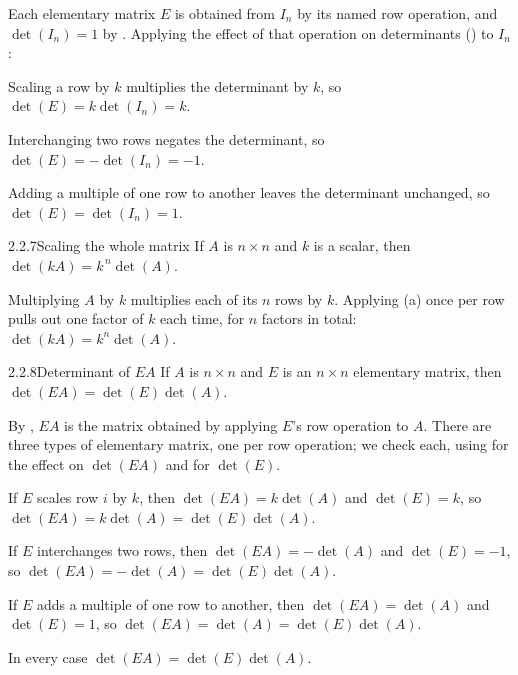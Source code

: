 \begin{prf}
Each elementary matrix $E$ is obtained from $I_n$ by its named row operation, and $\det(I_n)=1$ by . Applying the effect of that operation on determinants () to $I_n$:

 Scaling a row by $k$ multiplies the determinant by $k$, so $\det(E)=k\det(I_n)=k$.

 Interchanging two rows negates the determinant, so $\det(E)=-\det(I_n)=-1$.

 Adding a multiple of one row to another leaves the determinant unchanged, so $\det(E)=\det(I_n)=1$.
\end{prf}

\begin{thms}{2.2.7}{Scaling the whole matrix}
If $A$ is $n\times n$ and $k$ is a scalar, then $\det(kA)=k^{\,n}\det(A)$.
\end{thms}

\begin{prf}
Multiplying $A$ by $k$ multiplies each of its $n$ rows by $k$. Applying (a) once per row pulls out one factor of $k$ each time, for $n$ factors in total: $\det(kA)=k^n\det(A)$.
\end{prf}

\begin{thms}{2.2.8}{Determinant of $EA$}
If $A$ is $n\times n$ and $E$ is an $n\times n$ elementary matrix, then $\det(EA)=\det(E)\det(A)$.
\end{thms}

\begin{prf}
By , $EA$ is the matrix obtained by applying $E$'s row operation to $A$. There are three types of elementary matrix, one per row operation; we check each, using  for the effect on $\det(EA)$ and  for $\det(E)$.

 If $E$ scales row $i$ by $k$, then $\det(EA)=k\det(A)$ and $\det(E)=k$, so $\det(EA)=k\det(A)=\det(E)\det(A)$.

 If $E$ interchanges two rows, then $\det(EA)=-\det(A)$ and $\det(E)=-1$, so $\det(EA)=-\det(A)=\det(E)\det(A)$.

 If $E$ adds a multiple of one row to another, then $\det(EA)=\det(A)$ and $\det(E)=1$, so $\det(EA)=\det(A)=\det(E)\det(A)$.

\noindent In every case $\det(EA)=\det(E)\det(A)$.
\end{prf}

